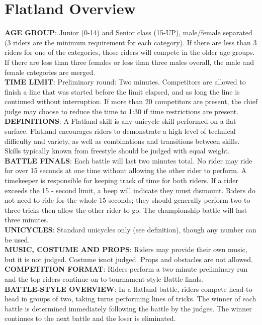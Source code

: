 \section{Flatland Overview}
\textbf{AGE GROUP}: Junior (0-14) and Senior class (15-UP), male/female separated (3 riders are the minimum requirement for each category). If there are less than 3 riders for one of the categories, those riders will compete in the older age groups. If there are less than three females or less than three males overall, the male and female categories are merged. \\
\textbf{TIME LIMIT}: Preliminary round: Two minutes. Competitors are allowed to finish a line that was started before the limit
elapsed, and as long the line is continued without interruption. If more than 20 competitors are present, the chief judge may choose to reduce the time to 1:30 if time restrictions are present.\\
\textbf{DEFINITIONS}: A Flatland skill is any unicycle skill performed on a flat surface. Flatland encourages riders to
demonstrate a high level of technical difficulty and variety, as well as combinations and transitions between skills. Skills typically known from freestyle should be judged with equal weight. \\
\textbf{BATTLE FINALS}: Each battle will last two minutes total. No rider may ride for over 15 seconds at one time without allowing the other rider to perform. A timekeeper is responsible for keeping track of time for both riders. If a rider exceeds the 15 - second limit, a beep will indicate they must dismount. Riders do not need to ride for the whole 15 seconds; they should generally perform two to three tricks then allow the other rider to go. The championship battle will last three minutes.\\
\textbf{UNICYCLES}: Standard unicycles only (see definition), though any number can be used.\\
\textbf{MUSIC, COSTUME AND PROPS}: Riders may provide their own music, but it is not judged. Costume isnot judged. Props and obstacles are not allowed.\\
\textbf{COMPETITION FORMAT}: Riders perform a two-minute preliminary run and the top riders continue on to tournament-style Battle finals.\\
\textbf{BATTLE-STYLE OVERVIEW}: In a flatland battle, riders compete head-to-head in groups of two, taking turns performing lines of tricks. The winner of each battle is determined immediately following the battle by the judges. The winner continues to the next battle and the loser is eliminated. \\
